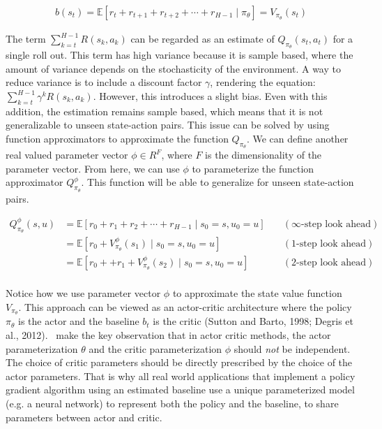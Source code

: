 \documentclass{../main.tex}{}
\begin{document}
\begin{equation}\label{equation:baseline-state-dependent}
\begin{aligned}
    b(s_t) = \mathbb{E}[r_t + r_{t+1} + r_{t+2} + \cdots + r_{H-1} \mid \pi_{\theta}] = V_{\pi_{\theta}}(s_t)
\end{aligned}
\end{equation}

The term $\sum_{k=t}^{H-1}R(s_k, a_k)$ can be regarded as an estimate of $Q_{\pi_{\theta}}(s_t, a_t)$ for a single roll out. This term has high variance because it is sample based, where the amount of variance depends on the stochasticity of the environment. A way to reduce variance is to include a discount factor $\gamma$, rendering the equation: $\sum_{k=t}^{H-1} \gamma^k  R(s_k, a_k)$. However, this introduces a slight bias. Even with this addition, the estimation remains sample based, which means that it is not generalizable to unseen state-action pairs. This issue can be solved by using function approximators to approximate the function $Q_{\pi_{\theta}}$. We can define another real valued parameter vector $\phi \in R^F$, where $F$ is the dimensionality of the parameter vector. From here, we can use $\phi$ to parameterize the function approximator $Q^{\phi}_{\pi_{\theta}}$. This function will be able to generalize for unseen state-action pairs. 

\begin{equation}
\begin{aligned}
Q^{\phi}_{\pi_{\theta}}(s,u) & = \mathbb{E}[r_0 + r_1 + r_2 + \cdots + r_{H-1} \mid s_0 = s, u_0 = u] \quad & (\infty\text{-step look ahead}) \\
                      & = \mathbb{E}[r_0 + V^{\phi}_{\pi_{\theta}}(s_1) \mid s_0 = s, u_0 = u] \quad & (1\text{-step look ahead}) \\
                      & = \mathbb{E}[r_0 + + r_1 + V^{\phi}_{\pi_{\theta}}(s_2) \mid s_0 = s, u_0 = u] \quad & (2\text{-step look ahead}) \\
\end{aligned}
\end{equation}

Notice how we use parameter vector $\phi$ to approximate the state value function $V_{\pi_{\theta}}$. This approach can be viewed as an actor-critic architecture where the policy $\pi_{\theta}$ is the actor and the baseline $b_t$ is the critic (Sutton and Barto, 1998; Degris et al., 2012).~\cite{Konda2000} make the key observation that in actor critic methods, the actor parameterization $\theta$ and the critic parameterization $\phi$ should \textit{not} be independent. The choice of critic parameters should be directly prescribed by the choice of the actor parameters. That is why all real world applications that implement a policy gradient algorithm using an estimated baseline use a unique parameterized model (e.g. a neural network) to represent both the policy and the baseline, to share parameters between actor and critic.
\end{document}
